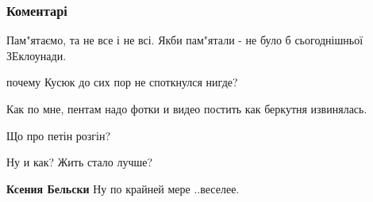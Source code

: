  
 
 
 
 
\subsubsection{Коментарі}

\begin{itemize} %
Пам"ятаємо, та не все і не всі. Якби пам"ятали - не було б сьогоднішньої ЗЕклоунади.

почему Кусюк до сих пор не споткнулся нигде?

Как по мне, пентам надо фотки и видео постить как беркутня извинялась.

Що про петін розгін?

Ну и как? Жить стало лучше?

\textbf{Ксения Бельски} Ну по крайней мере ..веселее.
\end{itemize} %
